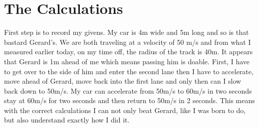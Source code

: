 \documentclass[a4paper, 11pt]{article} %
\begin{document}
\section*{The Calculations}

First step is to record my givens. My car is 4m wide and 5m long and so is that bastard Gerard's. We are both traveling at a velocity of 50 m/s and from what I measured earlier today, on my time off, the radius of the track is 40m. It appears that Gerard is 1m ahead of me which means passing him is doable. First, I have to get over to the side of him and enter the second lane then I have to accelerate, move ahead of Gerard, move back into the first lane and only then can I slow back down to 50m/s. My car can accelerate from 50m/s to 60m/s in two seconds stay at 60m/s for two seconds and then return to 50m/s in 2 seconds. This means with the correct calculations I can not only beat Gerard, like I was born to do, but also understand exactly how I did it.\\
\end{document}
